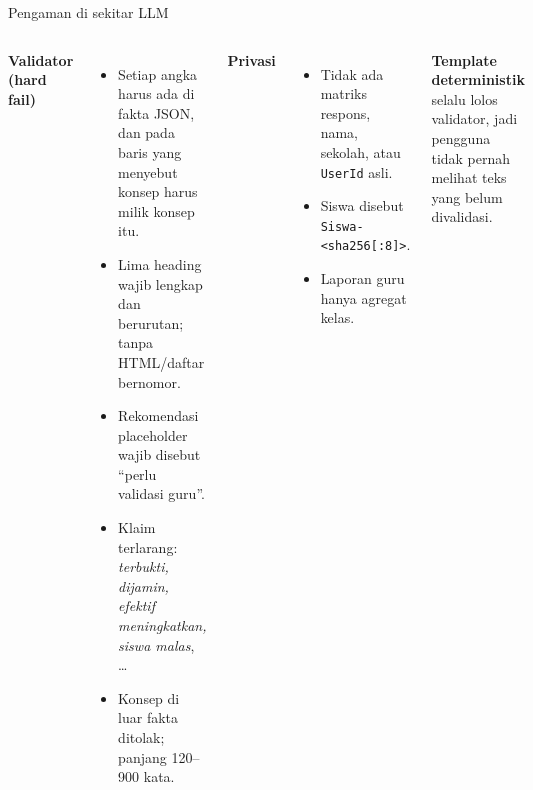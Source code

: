 \documentclass[aspectratio=169,10pt]{beamer}
\begin{document}
\begin{frame}{Pengaman di sekitar LLM}
  \centering
  \resizebox{0.95\linewidth}{!}{}
  \vspace{0.6em}

  \begin{columns}[T]
    \footnotesize
    \textbf{Validator (hard fail)}
    \begin{itemize}
      \item Setiap angka harus ada di fakta JSON, dan pada baris yang menyebut konsep harus milik konsep itu.
      \item Lima heading wajib lengkap dan berurutan; tanpa HTML/daftar bernomor.
      \item Rekomendasi placeholder wajib disebut ``perlu validasi guru''.
      \item Klaim terlarang: \emph{terbukti, dijamin, efektif meningkatkan, siswa malas}, \dots
      \item Konsep di luar fakta ditolak; panjang 120--900 kata.
    \end{itemize}
    \footnotesize
    \textbf{Privasi}
    \begin{itemize}
      \item Tidak ada matriks respons, nama, sekolah, atau \texttt{UserId} asli.
      \item Siswa disebut \texttt{Siswa-<sha256[:8]>}.
      \item Laporan guru hanya agregat kelas.
    \end{itemize}
    \textbf{Template deterministik} selalu lolos validator, jadi pengguna tidak pernah melihat teks yang belum
    divalidasi.
  \end{columns}
\end{frame}
\end{document}
